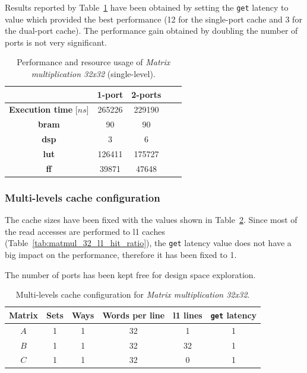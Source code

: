 \documentclass[11pt,a4paper,oneside]{memoir}
\begin{document}
Results reported by Table~\ref{tab:matmul_32_no_l1_report} have been obtained
by setting the \texttt{get} latency to value which provided the best performance
(12 for the single-port cache and 3 for the dual-port cache).
The performance gain obtained by doubling the number of ports is not very
significant.

\begin{table}[H]
	\begin{center}
		\begin{tabular}{ccccc}
			\hline
			\rowcolor{gray!50}
			& \textbf{1-port} & \textbf{2-ports} \\
			\hline
			\textbf{Execution time} [$ns$] & 265226 & 229190 \\
			\rowcolor{gray!25}
			\textbf{\ac{bram}} & 90 & 90 \\
			\textbf{\acs{dsp}} & 3 & 6 \\
			\rowcolor{gray!25}
			\textbf{\acs{lut}} & 126411 & 175727 \\
			\textbf{\acs{ff}} & 39871 & 47648 \\
			\hline
		\end{tabular}
	\end{center}
	\caption{Performance and resource usage of \emph{Matrix multiplication
	32x32} (single-level).}
	\label{tab:matmul_32_no_l1_report}
\end{table}

\subsubsection{Multi-levels cache configuration}
The cache sizes have been fixed with the values shown in
Table~\ref{tab:matmul_32_l1_config}. Since most of the read accesses are
performed to \ac{l1} caches (Table~\ref{tab:matmul_32_l1_hit_ratio}), the
\texttt{get} latency value does not have a big impact on the performance,
therefore it has been fixed to 1.

The number of ports has been kept free for design space exploration.

\begin{table}[H]
	\begin{center}
		\begin{tabular}{cccccc}
			\hline
			\rowcolor{gray!50}
			\textbf{Matrix} & \textbf{Sets} & \textbf{Ways} &
			\textbf{Words per line} & \textbf{\ac{l1} lines} &
			\textbf{\texttt{get} latency} \\
			\hline
			$A$ & 1 & 1 & 32 & 1 & 1 \\
			\rowcolor{gray!25}
			$B$ & 1 & 1 & 32 & 32 & 1 \\
			$C$ & 1 & 1 & 32 & 0 & 1 \\
			\hline
		\end{tabular}
	\end{center}
	\caption{Multi-levels cache configuration for \emph{Matrix
	multiplication 32x32}.}
	\label{tab:matmul_32_l1_config}
\end{table}
\end{document}
